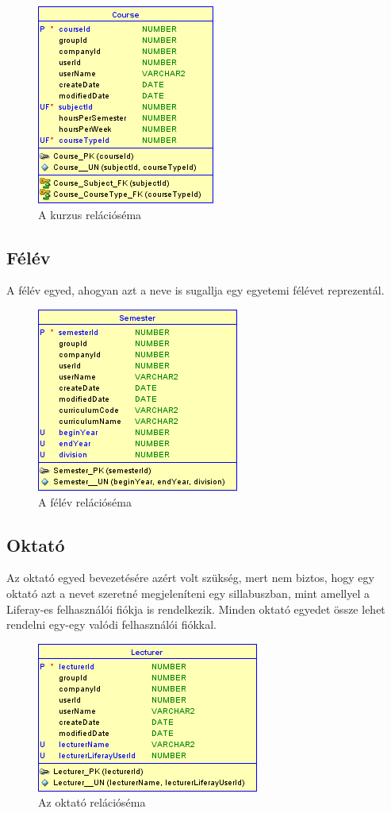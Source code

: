 \documentclass[hidelinks, 12pt, a4paper]{report}
\begin{document}
\begin{figure}[H]
    \centering
	\includegraphics{course.png}
	\caption{A kurzus relációséma}
\end{figure}

\subsection{Félév}

A félév egyed, ahogyan azt a neve is sugallja egy egyetemi félévet reprezentál.

\begin{figure}[H]
    \centering
	\includegraphics{semester.png}
	\caption{A félév relációséma}
\end{figure}

\subsection{Oktató}

Az oktató egyed bevezetésére azért volt szükség, mert nem biztos, hogy egy oktató azt a nevet szeretné megjeleníteni egy sillabuszban, mint amellyel a Liferay-es felhasználói fiókja is rendelkezik. Minden oktató egyedet össze lehet rendelni egy-egy valódi felhasználói fiókkal.

\begin{figure}[H]
    \centering
	\includegraphics{lecturer.png}
	\caption{Az oktató relációséma}
\end{figure}
\end{document}
